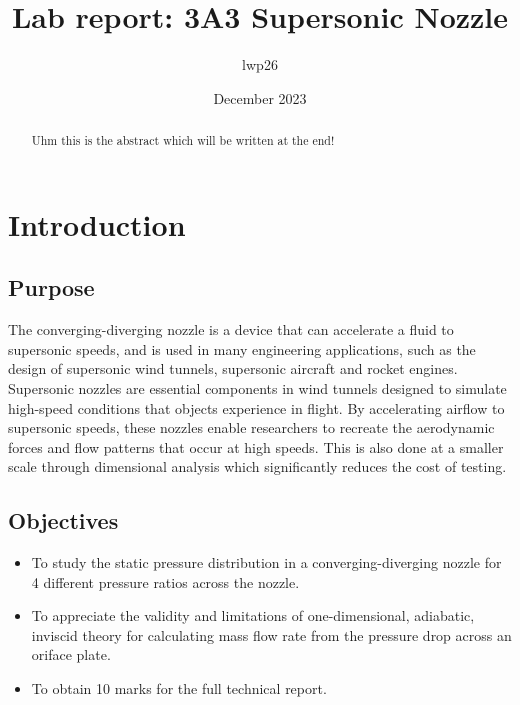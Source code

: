 \documentclass{article}
\begin{document}

\title{Lab report: 3A3 Supersonic Nozzle}
\author{lwp26}
\date{December 2023}
\maketitle

\begin{abstract}
    \centering
    Uhm this is the abstract which will be written at the end!
\end{abstract}

\newpage

\section{Introduction}

\subsection{Purpose}
The converging-diverging nozzle is a device that can accelerate a fluid to supersonic speeds, and is used in many engineering applications, such as the design of supersonic wind tunnels, supersonic aircraft and rocket engines.
Supersonic nozzles are essential components in wind tunnels designed to simulate high-speed conditions that objects experience in flight.
By accelerating airflow to supersonic speeds, these nozzles enable researchers to recreate the aerodynamic forces and flow patterns that occur at high speeds.
This is also done at a smaller scale through dimensional analysis which significantly reduces the cost of testing.


\subsection{Objectives}

\begin{itemize}
    \item To study the static pressure distribution in a converging-diverging nozzle for 4 different pressure ratios across the nozzle.
    \item To appreciate the validity and limitations of one-dimensional, adiabatic, inviscid theory for calculating mass flow rate from the pressure drop across an oriface plate.
    \item To obtain 10 marks for the full technical report.
\end{itemize}
\end{document}
